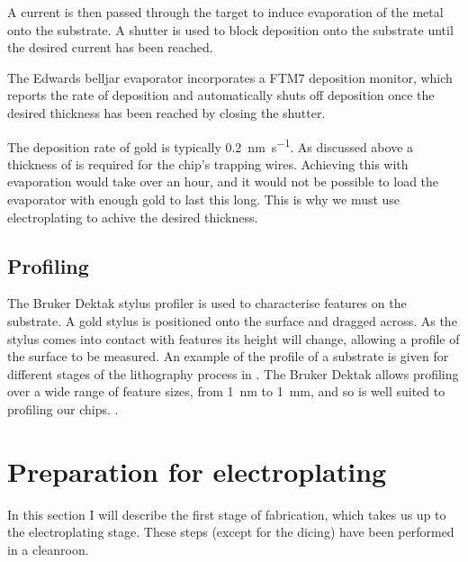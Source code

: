 {

A current is then passed through the target to induce evaporation of the metal
onto the substrate. A shutter is used to block deposition onto the substrate
until the desired current has been reached.

The Edwards belljar evaporator incorporates a FTM7 deposition monitor, which
reports the rate of deposition and automatically shuts off deposition once the
desired thickness has been reached by closing the shutter. 

The deposition rate of gold is typically \SI{0.2}{\nano\meter\per\second}.
%
%
As discussed above 
a thickness of  is required for the chip's trapping wires. Achieving
this with evaporation would take over an hour, and it would not be possible to
load the evaporator with enough gold to last this long. This is why we must use
electroplating to achive the desired thickness.

\subsection{Profiling}
\label{fab:profile}

The Bruker Dektak stylus profiler is used to characterise features on the
substrate. A gold stylus is positioned onto the surface and dragged across. As
the stylus comes into contact with features its height will change, allowing a
profile of the surface to be measured. An example of the profile of a substrate
is given for different stages of the lithography process in
. The Bruker Dektak allows profiling over a wide
range of feature sizes, from \SI{1}{\nano\meter} to \SI{1}{\milli\meter}, and
so is well suited to profiling our chips.
%
.


\section{Preparation for electroplating}
\label{fab:prep}

In this section I will describe the first stage of fabrication, which takes us
up to the electroplating stage. These steps (except for the dicing) have been
performed in a cleanroon.

}
